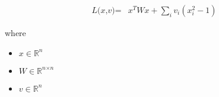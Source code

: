 \documentclass[12pt]{article}
\begin{document}
\begin{align*}
\textit{L(x,v)} = & \textit{x}^T\textit{W}\textit{x} + \sum_\textit{i} \textit{v}_{ \textit{i} }\left( \textit{x}_{ \textit{i} }^{2} - 1 \right)
\end{align*}

where
\begin{itemize}
\item $\textit{x} \in \mathbb{R}^{ \textit{n}}$
\item $\textit{W} \in \mathbb{R}^{ \textit{n} \times \textit{n} }$
\item $\textit{v} \in \mathbb{R}^{ \textit{n}}$
\end{itemize}
\end{document}
